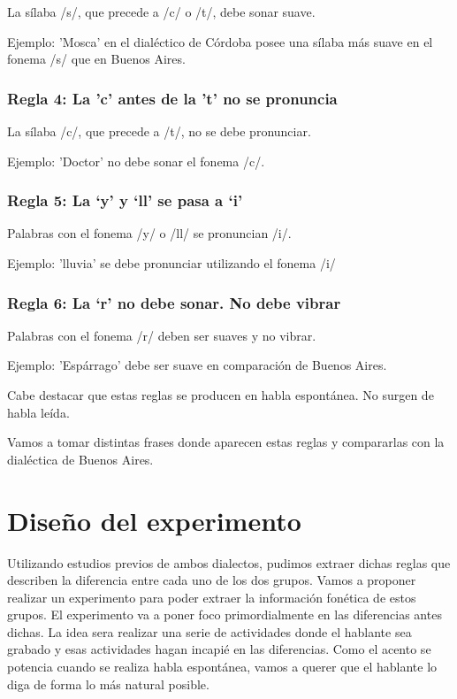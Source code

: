 \documentclass[11pt,a4paper,twoside]{tesis}
\begin{document}
La sílaba /s/, que precede a /c/ o /t/, debe sonar suave. 

Ejemplo: 'Mosca' en el dialéctico de Córdoba posee una sílaba más suave en el fonema /s/ que en Buenos Aires. 

\subsection*{Regla 4: La 'c' antes de la 't' no se pronuncia}

La sílaba /c/, que precede a /t/, no se debe pronunciar. 

Ejemplo: 'Doctor' no debe sonar el fonema /c/.

\subsection*{Regla 5: La ‘y’ y ‘ll’ se pasa a ‘i’}

Palabras con el fonema /y/ o /ll/ se pronuncian /i/. 


Ejemplo: 'lluvia' se debe pronunciar utilizando el fonema /i/ 

\subsection*{Regla 6: La ‘r’ no debe sonar. No debe vibrar}

Palabras con el fonema /r/ deben ser suaves y no vibrar. 

Ejemplo: 'Espárrago' debe ser suave en comparación de Buenos Aires. 

Cabe destacar que estas reglas se producen en habla espontánea. No surgen de habla leída. 

Vamos a tomar distintas frases donde aparecen estas reglas y compararlas con la dialéctica de Buenos Aires. 

\chapter{Diseño del experimento}

Utilizando estudios previos de ambos dialectos, pudimos extraer dichas reglas que describen la diferencia entre cada uno de los dos grupos. Vamos a proponer realizar un experimento para poder extraer la información fonética de estos grupos. El experimento va a poner foco primordialmente en las diferencias antes dichas. La idea sera realizar una serie de actividades donde el hablante sea grabado y esas actividades hagan incapié en las diferencias. Como el acento se potencia cuando se realiza habla espontánea, vamos a querer que el hablante lo diga de forma lo más natural posible. 
\end{document}
